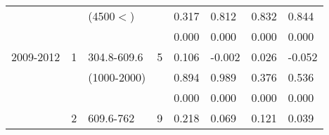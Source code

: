 \begin{table}[p]
\begin{tabular}{cclcllll}
                                                               &                                                                 & (4500$<$)                                                              &                                                                        &  0.317                                      & 0.812                                           & 0.832                                               & 0.844  \\ 
                                                               &                                                                 &                                                                                &                                                                        & 0.000                                       & 0.000                                           & 0.000                                               & 0.000  \\ \hline\noalign{\smallskip}
2009-2012                                              & 1                                                              & 304.8-609.6                                                           & 5                                                                     &  0.106                                      & -0.002                                          & 0.026                                               & -0.052  \\ 
                                                               &                                                                 & (1000-2000)                                                           &                                                                        & 0.894                                      & 0.989                                            & 0.376                                               & 0.536  \\ 
                                                               &                                                                 &                                                                                &                                                                        &  0.000                                     & 0.000                                            & 0.000                                               & 0.000  \\ \cline{5-8}\noalign{\smallskip}
                                                               & 2                                                              & 609.6-762                                                              & 9                                                                     & 0.218                                      & 0.069                                            & 0.121                                               & 0.039  \\ 

\end{tabular}
\end{table}
